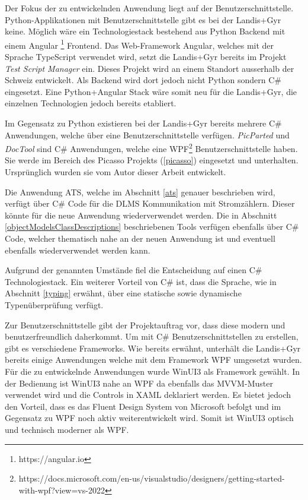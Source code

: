 Der Fokus der zu entwickelnden Anwendung liegt auf der Benutzerschnittstelle.
Python-Applikationen mit Benutzerschnittstelle gibt es bei der Landis+Gyr keine.
Möglich wäre ein Technologiestack bestehend aus Python Backend mit einem Angular \footnote{https://angular.io} Frontend.
Das Web-Framework Angular, welches mit der Sprache TypeScript verwendet wird, setzt die Landis+Gyr bereits im Projekt \textit{Test Script Manager} ein.
Dieses Projekt wird an einem Standort ausserhalb der Schweiz entwickelt.
Als Backend wird dort jedoch nicht Python sondern C\# eingesetzt.
Eine Python+Angular Stack wäre somit neu für die Landis+Gyr, die einzelnen Technologien jedoch bereits etabliert.

Im Gegensatz zu Python existieren bei der Landis+Gyr bereits mehrere C\# Anwendungen, welche über eine Benutzerschnittstelle verfügen.
\textit{PicParted} und \textit{DocTool} sind C\# Anwendungen, welche eine \ac{WPF}\footnote{https://docs.microsoft.com/en-us/visualstudio/designers/getting-started-with-wpf?view=vs-2022} Benutzerschnittstelle haben.
Sie werde im Bereich des Picasso Projekts (\ref{picasso}) eingesetzt und unterhalten. 
Ursprünglich wurden sie vom Autor dieser Arbeit entwickelt.

Die Anwendung \ac{ATS}, welche im Abschnitt \ref{ats} genauer beschrieben wird, verfügt über C\# Code für die \ac{DLMS} Kommunikation mit Stromzählern.
Dieser könnte für die neue Anwendung wiederverwendet werden.
Die in Abschnitt \ref{objectModelsClassDescriptions} beschriebenen Tools verfügen ebenfalls über C\# Code, welcher thematisch nahe an der neuen Anwendung ist und eventuell ebenfalls wiederverwendet werden kann.

Aufgrund der genannten Umstände fiel die Entscheidung auf einen C\# Technologiestack.
Ein weiterer Vorteil von C\# ist, dass die Sprache, wie in Abschnitt \ref{typing} erwähnt, über eine statische sowie dynamische Typenüberprüfung verfügt.

Zur Benutzerschnittstelle gibt der Projektauftrag vor, dass diese modern und benutzerfreundlich daherkommt.
Um mit C\# Benutzerschnittstellen zu erstellen, gibt es verschiedene Frameworks.
Wie bereits erwähnt, unterhält die Landis+Gyr bereits einige Anwendungen welche mit dem Framework \ac{WPF} umgesetzt wurden.
Für die zu entwickelnde Anwendungen wurde WinUI3 als Framework gewählt.
In der Bedienung ist WinUI3 nahe an \ac{WPF} da ebenfalls das \ac{MVVM}-Muster verwendet wird und die Controls in XAML deklariert werden.
Es bietet jedoch den Vorteil, dass es das Fluent Design System von Microsoft befolgt und im Gegensatz zu \ac{WPF} noch aktiv weiterentwickelt wird.
Somit ist WinUI3 optisch und technisch moderner als \ac{WPF}.

